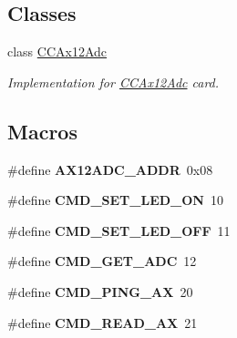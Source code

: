 \subsection*{Classes}
\begin{DoxyCompactItemize}
\item 
class \hyperlink{classCCAx12Adc}{C\+C\+Ax12\+Adc}
\begin{DoxyCompactList}\small\item\em Implementation for \hyperlink{classCCAx12Adc}{C\+C\+Ax12\+Adc} card. \end{DoxyCompactList}\end{DoxyCompactItemize}
\subsection*{Macros}
\begin{DoxyCompactItemize}
\item 
\mbox{\label{Driver-OPOS6UL__ARM_2CCAx12Adc_8hpp_a11c3429ef5816ff9292ff4891e1e9f0f}} 
\#define {\bfseries A\+X12\+A\+D\+C\+\_\+\+A\+D\+DR}~0x08
\item 
\mbox{\label{Driver-OPOS6UL__ARM_2CCAx12Adc_8hpp_a7e1515949622498f9414659f0c8f1f28}} 
\#define {\bfseries C\+M\+D\+\_\+\+S\+E\+T\+\_\+\+L\+E\+D\+\_\+\+ON}~10
\item 
\mbox{\label{Driver-OPOS6UL__ARM_2CCAx12Adc_8hpp_aec01094e11fafc299dd60d0a09944aa7}} 
\#define {\bfseries C\+M\+D\+\_\+\+S\+E\+T\+\_\+\+L\+E\+D\+\_\+\+O\+FF}~11
\item 
\mbox{\label{Driver-OPOS6UL__ARM_2CCAx12Adc_8hpp_ad8f637de49c5f4c0422b1c3d8c2449a6}} 
\#define {\bfseries C\+M\+D\+\_\+\+G\+E\+T\+\_\+\+A\+DC}~12
\item 
\mbox{\label{Driver-OPOS6UL__ARM_2CCAx12Adc_8hpp_a4e1dd6cd734aa509f3518fe45a266079}} 
\#define {\bfseries C\+M\+D\+\_\+\+P\+I\+N\+G\+\_\+\+AX}~20
\item 
\mbox{\label{Driver-OPOS6UL__ARM_2CCAx12Adc_8hpp_a1b73ec7cfd5c16a0341e5a4771fbc137}} 
\#define {\bfseries C\+M\+D\+\_\+\+R\+E\+A\+D\+\_\+\+AX}~21
\item 

\end{DoxyCompactItemize}
